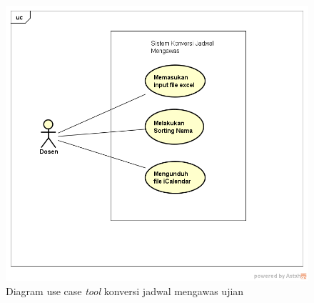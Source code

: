 \begin{figure}[h]
	\centering
	\includegraphics[scale=0.5]{Gambar/useCaseJadwal}
	\caption{Diagram use case \textit{tool} konversi jadwal mengawas ujian}
	\end{figure}

